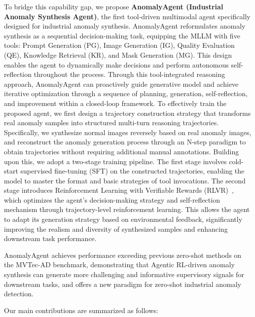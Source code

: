 \documentclass[sigconf]{acmart}
\begin{document}
To bridge this capability gap, we propose \textbf{AnomalyAgent (Industrial Anomaly Synthesis Agent)}, the first tool-driven multimodal agent specifically designed for industrial anomaly synthesis. AnomalyAgent reformulates anomaly synthesis as a sequential decision-making task, equipping the MLLM with five tools: Prompt Generation (PG), Image Generation (IG), Quality Evaluation (QE), Knowledge Retrieval (KR), and Mask Generation (MG). This design enables the agent to dynamically make decisions and perform autonomous self-reflection throughout the process. Through this tool-integrated reasoning approach, AnomalyAgent can proactively guide generative model and achieve iterative optimization through a sequence of planning, generation, self-reflection, and improvement within a closed-loop framework. To effectively train the proposed agent, we first design a trajectory construction strategy that transforms real anomaly samples into structured multi-turn reasoning trajectories. Specifically, we synthesize normal images reversely based on real anomaly images, and reconstruct the anomaly generation process through an N-step paradigm to obtain trajectories without requiring additional manual annotations. Building upon this, we adopt a two-stage training pipeline. The first stage involves cold-start supervised fine-tuning (SFT) on the constructed trajectories, enabling the model to master the format and basic strategies of tool invocations. The second stage introduces Reinforcement Learning with Verifiable Rewards (RLVR)~\cite{DBLP:journals/corr/abs-2402-03300}, which optimizes the agent's decision-making strategy and self-reflection mechanism through trajectory-level reinforcement learning. This allows the agent to adapt its generation strategy based on environmental feedback, significantly improving the realism and diversity of synthesized samples and enhancing downstream task performance.

AnomalyAgent achieves performance exceeding previous zero-shot methods on the MVTec-AD\cite{DBLP:journals/ijcv/BergmannBFSS21} benchmark, demonstrating that Agentic RL-driven anomaly synthesis can generate more challenging and informative supervisory signals for downstream tasks, and offers a new paradigm for zero-shot industrial anomaly detection.

Our main contributions are summarized as follows:
\end{document}
